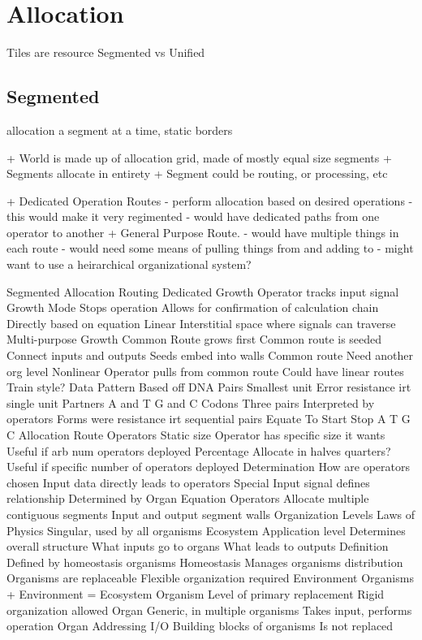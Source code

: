 \documentclass[article]{memoir}
\begin{document}
\section{Allocation}

Tiles are resource
Segmented vs Unified

\subsection{Segmented}

allocation a segment at a time, static borders

+ World is made up of allocation grid, made of mostly equal size segments
+ Segments allocate in entirety 
+ Segment could be routing, or processing, etc


+ Dedicated Operation Routes
- perform allocation based on desired operations
- this would make it very regimented
- would have dedicated paths from one operator to another
+ General Purpose Route.
- would have multiple things in each route
- would need some means of pulling things from and adding to
- might want to use a heirarchical organizational system?


Segmented Allocation
Routing
Dedicated
Growth
Operator tracks input signal
Growth Mode
Stops operation
Allows for confirmation of calculation chain
Directly based on equation
Linear
Interstitial space where signals can traverse
Multi-purpose
Growth
Common Route grows first
Common route is seeded
Connect inputs and outputs
Seeds embed into walls
Common route
Need another org level
Nonlinear
Operator pulls from common route
Could have linear routes
Train style?
Data
Pattern
Based off DNA
Pairs
Smallest unit
Error resistance irt single unit
Partners
A and T
G and C
Codons
Three pairs
Interpreted by operators
Forms were resistance irt sequential pairs
Equate To
Start
Stop
A
T
G
C
Allocation
Route
Operators
Static size
Operator has specific size it wants
Useful if arb num operators deployed
Percentage
Allocate in halves quarters?
Useful if specific number of operators deployed
Determination
How are operators chosen
Input data directly leads to operators
Special Input signal defines relationship​
Determined by Organ Equation
Operators
Allocate multiple contiguous segments
Input and output segment walls
Organization Levels
Laws of Physics
Singular, used by all organisms
Ecosystem
Application level
Determines
overall structure
What inputs go to organs
What leads to outputs
Definition
Defined by homeostasis organisms
Homeostasis
Manages organisms distribution
Organisms are replaceable
Flexible organization required
Environment
Organisms + Environment = Ecosystem
Organism
Level of primary replacement
Rigid organization allowed
Organ
Generic, in multiple organisms
Takes input, performs operation
Organ Addressing I/O
Building blocks of organisms
Is not replaced
\end{document}
